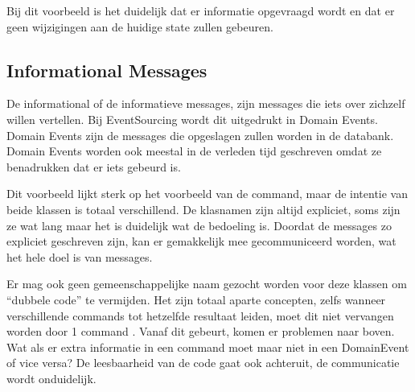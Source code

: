 
Bij dit voorbeeld is het duidelijk dat er informatie opgevraagd wordt en dat er geen wijzigingen aan de huidige \gls{state} zullen gebeuren.

\subsection{Informational Messages}
\label{subsec:informational-messages}

De informational of de informatieve messages, zijn messages die iets over zichzelf willen vertellen. Bij EventSourcing wordt dit uitgedrukt in Domain Events. Domain Events zijn de messages die opgeslagen zullen worden in de databank. Domain Events worden ook meestal in de verleden tijd geschreven omdat ze benadrukken dat er iets gebeurd is.


Dit voorbeeld lijkt sterk op het voorbeeld van de \Gls{command}, maar de intentie van beide klassen is totaal verschillend. De klasnamen zijn altijd expliciet, soms zijn ze wat lang maar het is duidelijk wat de bedoeling is. Doordat de messages zo expliciet geschreven zijn, kan er gemakkelijk mee gecommuniceerd worden, wat het hele doel is van messages.

Er mag ook geen gemeenschappelijke naam gezocht worden voor deze klassen om ``dubbele code'' te vermijden. Het zijn totaal aparte concepten, zelfs wanneer verschillende \Glspl{command} tot hetzelfde resultaat leiden, moet dit niet vervangen worden door 1 \Gls{command} \autocite{Verraes2014DDDLinguistic}. Vanaf dit gebeurt, komen er problemen naar boven. Wat als er extra informatie in een \Gls{command} moet maar niet in een DomainEvent of vice versa? De leesbaarheid van de code gaat ook achteruit, de communicatie wordt onduidelijk.
